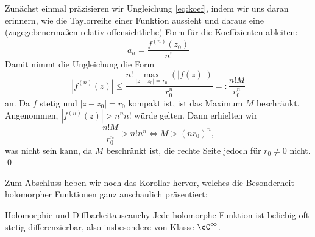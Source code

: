 \begin{lösung}
Zunächst einmal präzisieren wir Ungleichung \ref{eq:koef}, indem wir uns daran erinnern, wie die Taylorreihe einer Funktion aussieht und daraus eine (zugegebenermaßen relativ offensichtliche) Form für die Koeffizienten ableiten:
\begin{equation}
a_n = \frac{f^{(n)}(z_0)}{n!}
\end{equation}
Damit nimmt die Ungleichung die Form
\begin{equation}
|f^{(n)}(z)| \leq \frac{n! \max_{|z-z_0|=r_0}(|f(z)|)}{r_0^n} =:\frac{n!M}{r_0^n}
\end{equation}
an. Da $f$ stetig und $|z-z_0|=r_0$ kompakt ist, ist das Maximum $M$ beschränkt. Angenommen, $|f^{(n)}(z)| > n^n n!$ würde gelten. Dann erhielten wir
\begin{equation}
\frac{n!M}{r_0^n} > n! n^n \iff M > (nr_0)^n,
\end{equation}
was nicht sein kann, da $M$ beschränkt ist, die rechte Seite jedoch für $r_0 \neq 0$ nicht. \qed
\end{lösung}
Zum Abschluss heben wir noch das Korollar hervor, welches die Besonderheit holomorpher Funktionen ganz anschaulich präsentiert:
\begin{satz}{Holomorphie und Diffbarkeit}{auscauchy}
Jede holomorphe Funktion ist beliebig oft stetig differenzierbar, also insbesondere von Klasse $\cC^\infty$.        
\end{satz}
